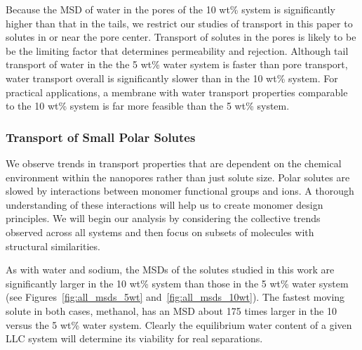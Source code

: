 \documentclass[journal=jpcbfk,manuscript=article]{achemso}
\begin{document}
  Because the MSD of water in the pores of the 10 wt\% system is significantly
  higher than that in the tails, we restrict our studies of transport in this paper to 
  solutes in or near the pore center. Transport of solutes in the pores 
  is likely to be
  be the 
  limiting factor that determines permeability and rejection. Although tail transport of water in the 
  the 5 wt\% water system is faster than pore transport, water transport overall is significantly slower
  than in the 10 wt\% system. For practical applications, a membrane with water 
  transport properties comparable to the 10 wt\% system is far more feasible than
  the 5 wt\% system.
 
%  
%
%
%

 \subsubsection{Transport of Small Polar Solutes}\label{section:general_transport_solutes}  
  
  We observe trends in transport properties that are dependent on the chemical 
  environment within the nanopores rather than just solute size. Polar solutes
  are slowed by interactions between monomer functional groups and ions. 
  A thorough understanding of these interactions will help us to create monomer
  design principles. We will begin our analysis by considering the collective
  trends observed across all systems and then focus on subsets of molecules
  with structural similarities.

  As with water and sodium, the MSDs of the solutes studied in this work are 
  significantly larger in the 10 wt\% system than those in the 5 wt\% water 
  system (see Figures~\ref{fig:all_msds_5wt} and~\ref{fig:all_msds_10wt}). The fastest moving solute in both cases, 
  methanol, has an MSD about 175 times larger in the 10 versus the 5 wt\%
  water system. Clearly the equilibrium water content of a given LLC system will 
  determine its viability for real separations.
  
\end{document}
